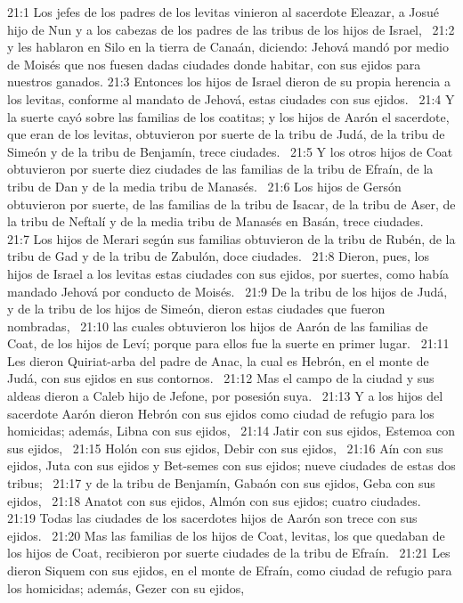 21:1 Los jefes de los padres de los levitas vinieron al sacerdote Eleazar, a Josué hijo de Nun y a los cabezas de los padres de las tribus de los hijos de Israel,  
21:2 y les hablaron en Silo en la tierra de Canaán, diciendo: Jehová mandó por medio de Moisés que nos fuesen dadas ciudades donde habitar, con sus ejidos para nuestros ganados. 
21:3 Entonces los hijos de Israel dieron de su propia herencia a los levitas, conforme al mandato de Jehová, estas ciudades con sus ejidos.  
21:4 Y la suerte cayó sobre las familias de los coatitas; y los hijos de Aarón el sacerdote, que eran de los levitas, obtuvieron por suerte de la tribu de Judá, de la tribu de Simeón y de la tribu de Benjamín, trece ciudades.  
21:5 Y los otros hijos de Coat obtuvieron por suerte diez ciudades de las familias de la tribu de Efraín, de la tribu de Dan y de la media tribu de Manasés.  
21:6 Los hijos de Gersón obtuvieron por suerte, de las familias de la tribu de Isacar, de la tribu de Aser, de la tribu de Neftalí y de la media tribu de Manasés en Basán, trece ciudades.  
21:7 Los hijos de Merari según sus familias obtuvieron de la tribu de Rubén, de la tribu de Gad y de la tribu de Zabulón, doce ciudades.  
21:8 Dieron, pues, los hijos de Israel a los levitas estas ciudades con sus ejidos, por suertes, como había mandado Jehová por conducto de Moisés.  
21:9 De la tribu de los hijos de Judá, y de la tribu de los hijos de Simeón, dieron estas ciudades que fueron nombradas,  
21:10 las cuales obtuvieron los hijos de Aarón de las familias de Coat, de los hijos de Leví; porque para ellos fue la suerte en primer lugar.  
21:11 Les dieron Quiriat-arba del padre de Anac, la cual es Hebrón, en el monte de Judá, con sus ejidos en sus contornos.  
21:12 Mas el campo de la ciudad y sus aldeas dieron a Caleb hijo de Jefone, por posesión suya.  
21:13 Y a los hijos del sacerdote Aarón dieron Hebrón con sus ejidos como ciudad de refugio para los homicidas; además, Libna con sus ejidos,  
21:14 Jatir con sus ejidos, Estemoa con sus ejidos,  
21:15 Holón con sus ejidos, Debir con sus ejidos,  
21:16 Aín con sus ejidos, Juta con sus ejidos y Bet-semes con sus ejidos; nueve ciudades de estas dos tribus;  
21:17 y de la tribu de Benjamín, Gabaón con sus ejidos, Geba con sus ejidos,  
21:18 Anatot con sus ejidos, Almón con sus ejidos; cuatro ciudades.  
21:19 Todas las ciudades de los sacerdotes hijos de Aarón son trece con sus ejidos.  
21:20 Mas las familias de los hijos de Coat, levitas, los que quedaban de los hijos de Coat, recibieron por suerte ciudades de la tribu de Efraín.  
21:21 Les dieron Siquem con sus ejidos, en el monte de Efraín, como ciudad de refugio para los homicidas; además, Gezer con su ejidos,  
